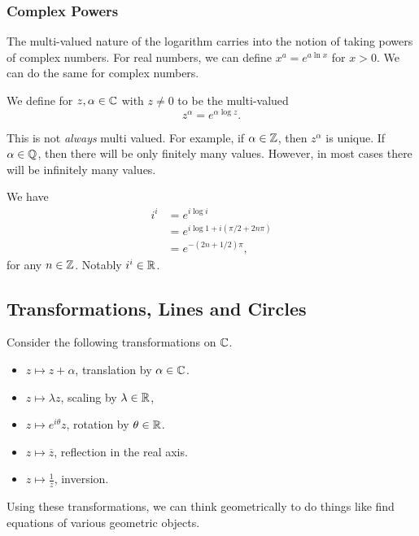 \documentclass[a4paper]{scrartcl}
\begin{document}
\subsubsection{Complex Powers}

The multi-valued nature of the logarithm carries into the notion of taking powers of complex numbers.
For real numbers, we can define $x^a = e^{a \ln x}$ for $x > 0$. We can do the same for complex numbers.

\begin{definition}
	We define  for $z, \alpha \in \mathbb{C}$ with $z \neq 0$ to be the multi-valued
	$$
	z^{\alpha} = e^{\alpha \log z}.
	$$
\end{definition}

This is not \emph{always} multi valued. For example, if $\alpha \in \mathbb{Z}$, then $z^\alpha$ is unique. If $\alpha \in \mathbb{Q}$, then there will be only finitely many values. However, in most cases there will be infinitely many values.

\begin{example}[Calculating $i^i$]
	We have
	\begin{align*}
		i^i &= e^{i \log i} \\
		&= e^{i \log 1 + i(\pi/2 + 2n\pi)} \\
		&= e^{-(2n + 1/2)\pi},
	\end{align*}
	for any $n \in \mathbb{Z}$. Notably $i^i \in \mathbb{R}$.
\end{example}


\subsection{Transformations, Lines and Circles}

Consider the following transformations on $\mathbb{C}$.
\begin{itemize}
	\item $z \mapsto z + \alpha$, translation by $\alpha \in \mathbb{C}$.
	\item $z \mapsto \lambda z$, scaling by $\lambda \in \mathbb{R}$,
	\item $z \mapsto e^{i \theta} z$, rotation by $\theta \in \mathbb{R}$. 
	\item $z \mapsto \overline{z}$, reflection in the real axis.
	\item $z \mapsto \frac{1}{z}$, inversion.
\end{itemize}
Using these transformations, we can think geometrically to do things like find equations of various geometric objects.
\end{document}
